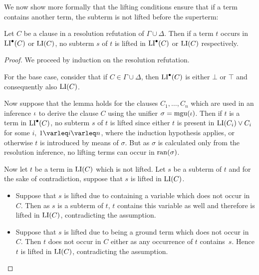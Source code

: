 We now show more formally that the lifting conditions ensure that if a term contains another term, the subterm is not lifted before the superterm:


\begin{lemma}
	\label{lemma:lifting_conditions}
	Let $C$ be a clause in a resolution refutation of $\Gamma \cup \Delta$.
	Then if a term $t$ occurs in $\operatorname{LI}^\bullet(C)$ or $\operatorname{LI}(C)$, no subterm $s$ of $t$ is lifted in $\operatorname{LI}^\bullet(C)$ or $\operatorname{LI}(C)$ respectively.
\end{lemma}
\begin{proof}
	We proceed by induction on the resolution refutation.

	For the base case, consider that if $C \in \Gamma \cup \Delta$, then $\operatorname{LI}^\bullet(C)$ is either $\bot$ or $\top$ and consequently also $\operatorname{LI}(C)$.

	Now suppose that the lemma holds for the clauses $C_1, \dots, C_n$ which are used in an inference $\iota$ to derive the clause $C$ using the unifier $\sigma = \operatorname{mgu}(\iota)$.
	Then if $t$ is a term in $\operatorname{LI}^\bullet(C)$, no subterm $s$ of $t$ is lifted since either $t$ is present in $\operatorname{LI}(C_i) \lor C_i$ for some $i$, $1\varleq i \varleq n$, where the induction hypothesis applies,
	or otherwise $t$ is introduced by means of $\sigma$. But as $\sigma$ is calculated only from the resolution inference, no lifting terms can occur in $\operatorname{ran}(\sigma)$.

	Now let $t$ be a term in $\operatorname{LI}(C)$ which is not lifted. Let $s$ be a subterm of $t$ and for the sake of contradiction, suppose that $s$ is lifted in $\operatorname{LI}(C)$.
	\begin{itemize}
		\item Suppose that $s$ is lifted due to containing a variable which does not occur in\nolinebreak{} $C$.
			Then as $s$ is a subterm of $t$, $t$ contains this variable as well and therefore is lifted in $\operatorname{LI}(C)$, contradicting the assumption.

		\item Suppose that $s$ is lifted due to being a ground term which does not occur in\nolinebreak{} $C$.
			Then $t$ does not occur in $C$ either as any occurrence of $t$ contains~$s$. 
			Hence $t$ is lifted in $\operatorname{LI}(C)$, contradicting the assumption.
			\qedhere
	\end{itemize}
\end{proof}


